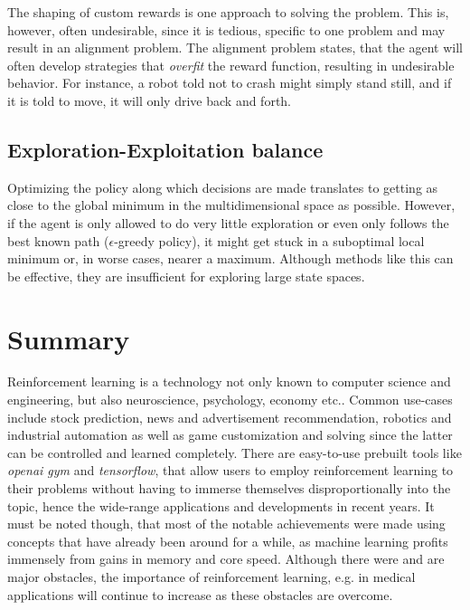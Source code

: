\documentclass[12pt,a4]{article}
\begin{document}
The shaping of custom rewards is one approach to solving the problem. This is, however, often undesirable, since it is tedious, specific to one problem and may result in an alignment problem.
The alignment problem states, that the agent will often develop strategies that \emph{overfit} the reward function, resulting in undesirable behavior. For instance, a robot told not to crash might simply stand still, and if it is told to move, it will only drive back and forth. \citep{KrieselKNN} \citep{DSilver}

\subsection{Exploration-Exploitation balance}
Optimizing the policy along which decisions are made translates to getting as close to the global minimum in the multidimensional space as possible. However, if the agent is only allowed to do very little exploration or even only follows the best known path (\(\epsilon\)-greedy policy), it might get stuck in a suboptimal local minimum or, in worse cases, nearer a maximum. Although methods like this can be effective, they are insufficient for exploring large state spaces.  \citep{DSilver} \citep{KrieselKNN}



\section{Summary}
Reinforcement learning is a technology not only known to computer science and engineering, but also neuroscience, psychology, economy etc.. Common use-cases include stock prediction, news and advertisement recommendation, robotics and industrial automation as well as game customization and solving since the latter can be controlled and learned completely. There are easy-to-use prebuilt tools like \emph{openai gym} and \emph{tensorflow}, that allow users to employ reinforcement learning to their problems without having to immerse themselves disproportionally into the topic, hence the wide-range applications and developments in recent years. It must be noted though, that most of the notable achievements were made using concepts that have already been around for a while, as machine learning profits immensely from gains in memory and core speed. Although there were and are major obstacles, the importance of reinforcement learning, e.g. in medical applications will continue to increase as these obstacles are overcome.
\citep{Pong} \citep{RLOverview}


\end{document}
